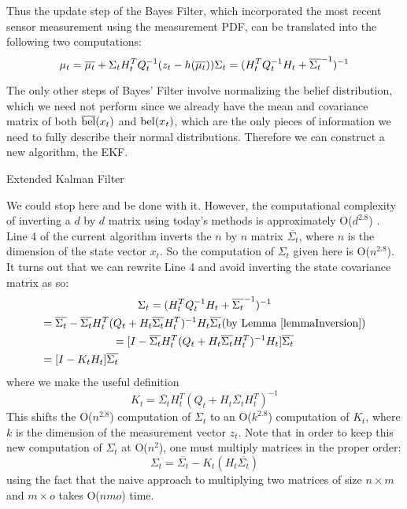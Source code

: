 Thus the update step of the Bayes Filter, which incorporated the most recent sensor measurement using the measurement PDF, can be translated into the following two computations:
\[
\mu_t = \overline{\mu_t} + \Sigma_t H_t^TQ_t^{-1}(z_t - h(\overline{\mu_t})) \\
\Sigma_t = (H_t^T Q_t^{-1} H_t + \overline{\Sigma_t}^{-1})^{-1}
\]

The only other steps of Bayes' Filter involve normalizing the belief distribution, which we need not perform since we already have the mean and covariance matrix of both \(\overline{\mathrm{bel}}(x_t)\) and \(\mathrm{bel}(x_t)\), which are the only pieces of information we need to fully describe their normal distributions. Therefore we can construct a new algorithm, the EKF.
\begin{algorithm} 
	\caption{Extended Kalman Filter}
	\label{alg:EKFnonOptimal}
	\begin{algorithmic}[1]
		\State {}
		\EndFunction
	\end{algorithmic}
\end{algorithm}

We could stop here and be done with it. However, the computational complexity of inverting a \(d\) by \(d\) matrix using today's methods is approximately O(\(d^{2.8}\)) \cite{}. Line 4 of the current algorithm inverts the \(n\) by \(n\) matrix \(\overline{\Sigma_t}\), where \(n\) is the dimension of the state vector \(x_t\). So the computation of \(\Sigma_t\) given here is O(\(n^{2.8}\)). It turns out that we can rewrite Line 4 and avoid inverting the state covariance matrix as so:
\begin{multline*}
\Sigma_t = (H_t^T Q_t^{-1} H_t + \overline{\Sigma_t}^{-1})^{-1} \\
= \overline{\Sigma_t} - \overline{\Sigma_t} H_t^T (Q_t + H_t \overline{\Sigma_t} H_t^T)^{-1} H_t \overline{\Sigma_t} \hfill \text{(by Lemma \ref{lemmaInversion})} \\
= [ I - \overline{\Sigma_t} H_t^T (Q_t + H_t \overline{\Sigma_t} H_t^T)^{-1} H_t ] \overline{\Sigma_t} \\
= [I - K_t H_t] \overline{\Sigma_t} \hfill
\end{multline*}
where we make the useful definition 
\[
K_t = \overline{\Sigma_t} H_t^T (Q_t + H_t \overline{\Sigma_t} H_t^T)^{-1}
\]
This shifts the O(\(n^{2.8}\)) computation of \(\Sigma_t\) to an O(\(k^{2.8}\)) computation of \(K_t\), where \(k\) is the dimension of the measurement vector \(z_t\). Note that in order to keep this new computation of \(\Sigma_t\) at O(\(n^2\)), one must multiply matrices in the proper order:
\[\Sigma_t = \overline{\Sigma_t} - K_t (H_t \overline{\Sigma_t})
\]
using the fact that the naive approach to multiplying two matrices of size \(n \times m\) and \(m \times o\) takes O(\(n m o\)) time.

